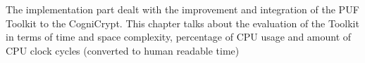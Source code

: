 The implementation part dealt with the improvement and integration of the PUF Toolkit to the CogniCrypt. This chapter talks about the evaluation of the Toolkit in terms of time and space complexity, percentage of CPU usage and amount of CPU clock cycles (converted to human readable time)
